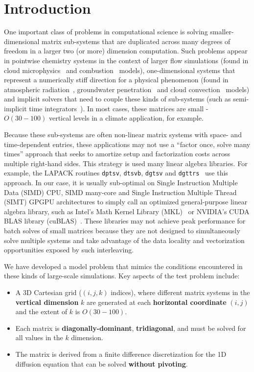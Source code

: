 \documentclass[10pt, conference, compsocconf]{IEEEtran}
\begin{document}
\section{Introduction}
\label{sec:intro}

One important class of problems in computational science is solving
  smaller-dimensional matrix sub-systems that are duplicated across
  many degrees of freedom in a larger two (or more) dimension computation.
Such problems appear in
  pointwise chemistry systems in the context of larger 
    flow simulations (found in cloud microphysics~\cite{climate_mg2} and
    combustion~\cite{combustion_pazner} models),
  one-dimensional systems that represent a numerically stiff
    direction for a physical phenomenon (found in atmospheric
    radiation~\cite{climate_rrtmg}, groundwater
    penetration~\cite{pflotran_groundwater} and cloud
    convection~\cite{climate_sam} models) and
  implicit solvers that need to couple these kinds of sub-systems
    (such as semi-implicit time integrators~\cite{imex}).
In most cases, these matrices are small - \(O(30-100)\) 
  vertical levels in a climate application, for example.

Because these sub-systems are often non-linear matrix systems with space- and 
  time-dependent entries, these applications may not use a 
  ``factor once, solve many times'' approach that seeks to amortize 
  setup and factorization costs across multiple right-hand sides.
This strategy is used many linear algebra libraries. For example, the LAPACK
  routines \lstinline{dptsv}, \lstinline{dtsvb}, \lstinline{dgtsv} and
  \lstinline{dgttrs}~\cite{mkl} use this approach.
In our case, it is usually sub-optimal on Single Instruction Multiple Data
  (SIMD) CPU, SIMD many-core and Single Instruction Multiple Thread (SIMT)
  GPGPU architectures to simply call an optimized general-purpose linear
  algebra library, such as Intel's Math Kernel Library (MKL)~\cite{mkl} or
  NVIDIA's CUDA BLAS library (cuBLAS)~\cite{cublas}.
These libraries may not achieve peak performance for batch solves of small
  matrices because they are not designed to simultaneously solve multiple
  systems and take advantage of the data locality and vectorization
  opportunities exposed by such interleaving. 
  
We have developed a model problem that mimics the conditions encountered in
  these kinds of large-scale simulations. 
Key aspects of the test problem include:
\begin{itemize}
\item A 3D Cartesian grid (\((i,j,k)\) indices), where different matrix
  systems in the \textbf{vertical dimension} \(k\) are generated at each
  \textbf{horizontal coordinate} \((i,j)\) and the extent of \(k\) is
  \(O(30-100)\).
\item Each matrix is \textbf{diagonally-dominant}, \textbf{tridiagonal}, and
  must be solved for all values in the \(k\) dimension.
\item The matrix is derived from a finite difference discretization for the
  1D diffusion equation that can be solved \textbf{without pivoting}.
\end{itemize}
\end{document}
